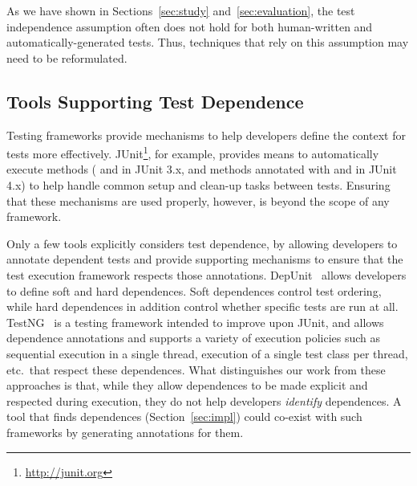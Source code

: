 As we have shown in Sections~\ref{sec:study} and~\ref{sec:evaluation},
the test independence assumption often does not hold for both
human-written and automatically-generated tests. Thus, techniques
that rely on this assumption may need to be reformulated.

\subsection{Tools Supporting Test Dependence}
\label{sec:supporting}

Testing frameworks provide mechanisms
to help developers define the context for tests more effectively.
JUnit\footnote{\url{http://junit.org}}, for example, provides means to
automatically execute methods ( and  in JUnit
3.x, and methods annotated with  and  in
JUnit 4.x) to help handle common setup and clean-up tasks between
tests. Ensuring that these mechanisms are used properly, however, is
beyond the scope of any framework. 


Only a few tools explicitly considers test dependence, by
allowing developers to annotate dependent tests and
provide supporting mechanisms to ensure that the test execution framework
respects those annotations.  DepUnit~\cite{depunit}
allows developers to define soft and hard dependences. Soft dependences control
test ordering, while hard dependences in addition control whether specific tests are
run at all.  TestNG~\cite{testng} is a testing framework intended to improve upon JUnit,
and allows dependence annotations and supports a variety of execution policies such as sequential execution
in a single thread, execution of a single test class per thread, etc.\
that respect these dependences.
What distinguishes our work from these approaches is that, while they allow dependences
to be made explicit and respected during execution, they do not help developers
\emph{identify} dependences.  A tool that finds dependences
(Section~\ref{sec:impl}) could co-exist
with such frameworks by generating annotations for them.


